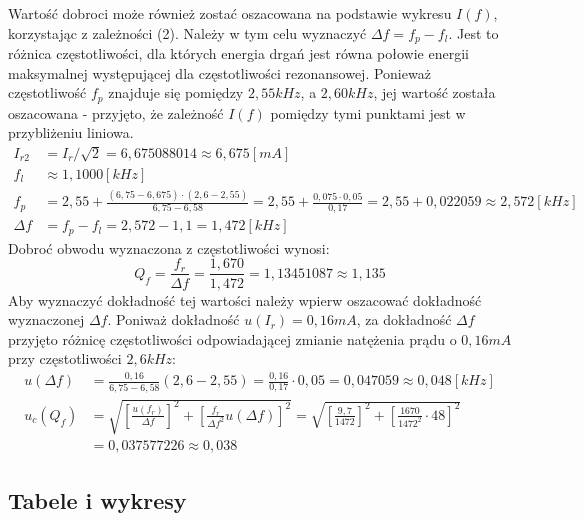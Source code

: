 \documentclass[polish, 11pt, a4paper]{article}
\begin{document}
		Wartość dobroci może również zostać oszacowana na podstawie wykresu \(I(f)\), korzystając z zależności (2). Należy w tym celu wyznaczyć \(\Delta f = f_p - f_l\).
		Jest to różnica częstotliwości, dla których energia drgań jest równa połowie energii maksymalnej występującej dla częstotliwości rezonansowej.
		Ponieważ częstotliwość \(f_p\) znajduje się pomiędzy \(2,55kHz\), a \(2,60kHz\), jej wartość została oszacowana
		- przyjęto, że zależność \(I(f)\) pomiędzy tymi punktami jest w przybliżeniu liniowa.
		\begin{align*}
			I_{r2}	&=	I_r/\sqrt{2} = 6,675088014 \approx 6,675 [mA]	\\[6pt]
			f_l	&\approx 1,1000 [kHz]\\[6pt]
			f_p	&= 2,55+\frac{(6,75-6,675)\cdot (2,6-2,55)}{6,75-6,58} = 2,55+\frac{0,075\cdot 0,05}{0,17} = 2,55 + 0,022059 \approx 2,572 [kHz]\\[6pt]
			\Delta f &= f_p-f_l = 2,572 - 1,1 = 1,472 [kHz]
		\end{align*}
		Dobroć obwodu wyznaczona z częstotliwości wynosi:
		\begin{displaymath}
			Q_f	= \frac{f_r}{\Delta f} = \frac{1,670}{1,472} = 1,13451087 \approx 1,135			
		\end{displaymath}
		Aby wyznaczyć dokładność tej wartości należy wpierw oszacować dokładność wyznaczonej \(\Delta f\).
		Poniważ dokładność \(u(I_r)=0,16mA\), za dokładność \(\Delta f\) przyjęto różnicę częstotliwości odpowiadającej zmianie natężenia prądu o \(0,16mA\) przy częstotliwości \(2,6kHz\):
		\begin{align*}
			u(\Delta f) &= \frac{0,16}{6,75-6,58}(2,6-2,55) = \frac{0,16}{0,17}\cdot 0,05 = 0,047059 \approx 0,048 [kHz]\\[6pt]
			u_c(Q_f)	&=	\sqrt{\left[ \frac{u(f_r)}{\Delta f}\right]^2 + \left[ \frac{f_r}{\Delta f^2} u(\Delta f)\right]^2}
			=	\sqrt{\left[ \frac{9,7}{1472}\right]^2 + \left[ \frac{1670}{1472^2}\cdot 48\right]^2}\\[6pt]
			&=	0,037577226	\approx 0,038		
		\end{align*}
	
	\newpage
    \subsection{Tabele i wykresy}
    
\end{document}
